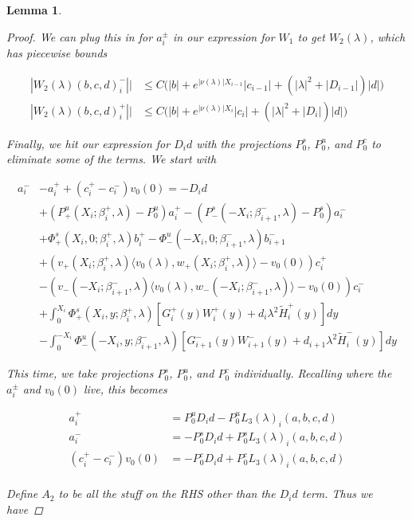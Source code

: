 \documentclass[12pt]{article}
\newtheorem{lemma}{Lemma}
\begin{document}
\begin{lemma}
\begin{proof}
We can plug this in for $a_i^\pm$ in our expression for $W_1$ to get $W_2(\lambda)$, which has piecewise bounds

\begin{align*}
|W_2(\lambda)(b,c,d)_i^-|| &\leq C \Big( |b| + e^{|\nu(\lambda)|X_{i-1}}|c_{i-1}| + (|\lambda|^2 + |D_{i-1}|)|d| \Big) \\
|W_2(\lambda)(b,c,d)_i^+|| 
&\leq C \Big( |b| + e^{|\nu(\lambda)|X_i}|c_i| + (|\lambda|^2 + |D_i|)|d| \Big)
\end{align*}

Finally, we hit our expression for $D_i d$ with the projections $P^s_0$, $P^u_0$, and $P^c_0$ to eliminate some of the terms. We start with

\begin{align*}
a_i^- &- a_i^+ + (c_i^+ - c_i^-)v_0(0) = -D_i d  \\
&+ (P^u_+(X_i; \beta_i^+, \lambda) - P_0^u)a_i^+ - (P^s_-(-X_i; \beta_{i+1}^-,\lambda) - P_0^s)a_i^- \\
&+ \Phi^s_+(X_i, 0; \beta_i^+, \lambda)b_i^+ - \Phi^u_-(-X_i, 0; \beta_{i+1}^-, \lambda) b_{i+1}^- \\
&+ (v_+(X_i; \beta_i^+, \lambda) \langle v_0(\lambda), w_+(X_i; \beta_i^+, \lambda) \rangle - v_0(0) ) c_i^+ \\
&- (v_-(-X_i; \beta_{i+1}^-, \lambda) \langle v_0(\lambda), w_-(-X_i; \beta_{i+1}^-, \lambda) \rangle - v_0(0) ) c_i^- \\
&+ \int_0^{X_i} \Phi^s_+(X_i, y; \beta_i^+, \lambda) [ G_i^+(y) W_i^+(y) + d_i \lambda^2 \tilde{H}_i^+(y) ] dy \\
&- \int_0^{-X_i} \Phi^u_-(-X_i, y; \beta_{i+1}^-, \lambda) [ G_{i+1}^-(y) W_{i+1}^-(y) + d_{i+1} \lambda^2 \tilde{H}_i^-(y) ] dy
\end{align*}

This time, we take projections $P^s_0$, $P^u_0$, and $P^c_0$ individually. Recalling where the $a_i^\pm$ and $v_0(0)$ live, this becomes 

\begin{align*}
a_i^+ &= P^u_0 D_i d - P^u_0 L_3(\lambda)_i(a, b, c, d) \\
a_i^- &= -P^s_0 D_i d + P^s_0 L_3(\lambda)_i(a, b, c, d) \\
(c_i^+ - c_i^-)v_0(0) &= -P^c_0 D_i d + P^c_0 L_3(\lambda)_i(a, b, c, d) \\
\end{align*}

Define $A_2$ to be all the stuff on the RHS other than the $D_i d$ term. Thus we have 


\end{proof}
\end{lemma}
\end{document}
